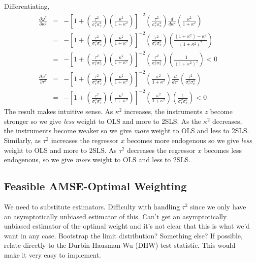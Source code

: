 \documentclass[12pt]{article}
\theoremstyle{definition}
\begin{document}
Differentiating,
  \begin{eqnarray*}
    \frac{\partial \omega^*}{\partial \kappa^2} &=& -\left[1 + \left(\frac{\tau^2}{\sigma_\epsilon^2 \sigma_v^2}\right)\left( \frac{\kappa^2}{1 + \kappa^2}\right)\right]^{-2} \left( \frac{\tau^2}{\sigma_\epsilon^2 \sigma_v^2} \right) \frac{d}{d\kappa^2} \left(\frac{\kappa^2}{1 + \kappa^2} \right)\\
      &=&  -\left[1 + \left(\frac{\tau^2}{\sigma_\epsilon^2 \sigma_v^2}\right)\left( \frac{\kappa^2}{1 + \kappa^2}\right)\right]^{-2} \left( \frac{\tau^2}{\sigma_\epsilon^2 \sigma_v^2} \right)  \left(\frac{(1+ \kappa^2) - \kappa^2}{(1 + \kappa^2)^2} \right)\\
      &=& -\left[1 + \left(\frac{\tau^2}{\sigma_\epsilon^2 \sigma_v^2}\right)\left( \frac{\kappa^2}{1 + \kappa^2}\right)\right]^{-2} \left( \frac{\tau^2}{\sigma_\epsilon^2 \sigma_v^2} \right)  \left(\frac{1}{(1 + \kappa^2)^2} \right) < 0\\
    \frac{\partial \omega^*}{\partial \tau^2} &=&-\left[1 + \left(\frac{\tau^2}{\sigma_\epsilon^2 \sigma_v^2}\right)\left( \frac{\kappa^2}{1 + \kappa^2}\right)\right]^{-2}\left(\frac{\kappa^2}{1 + \kappa^2} \right)\frac{d}{d\tau^2}\left( \frac{\tau^2}{\sigma_\epsilon^2 \sigma_v^2} \right) \\
    &=&-\left[1 + \left(\frac{\tau^2}{\sigma_\epsilon^2 \sigma_v^2}\right)\left( \frac{\kappa^2}{1 + \kappa^2}\right)\right]^{-2}\left(\frac{\kappa^2}{1 + \kappa^2} \right)\left( \frac{1}{\sigma_\epsilon^2 \sigma_v^2} \right) < 0 
  \end{eqnarray*}
  The result makes intuitive sense. As $\kappa^2$ increases, the instruments $z$ become stronger so we give \emph{less} weight to OLS and more to 2SLS. As the $\kappa^2$ decreases, the instruments become weaker so we give \emph{more} weight to OLS and less to 2SLS. Similarly, as $\tau^2$ increases the regressor $x$ becomes more endogenous so we give \emph{less} weight to OLS and more to 2SLS. As $\tau^2$ decreases the regressor $x$ becomes less endogenous, so we give \emph{more} weight to OLS and less to 2SLS.

\subsection{Feasible AMSE-Optimal Weighting} %
\label{sub:feasible_amse_optimal_weighting}
We need to substitute estimators. Difficulty with handling $\tau^2$ since we only have an asymptotically unbiased estimator of this. Can't get an asymptotically unbiased estimator of the optimal weight and it's not clear that this is what we'd want in any case. Bootstrap the limit distribution? Something else? If possible, relate directly to the Durbin-Hausman-Wu (DHW) test statistic. This would make it very easy to implement.
\end{document}
